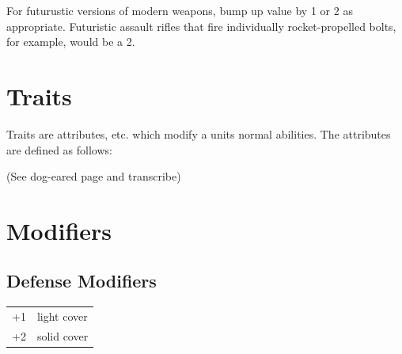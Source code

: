 \documentclass[12pt,titlepage]{article}
\begin{document}
  For futurustic versions of modern weapons, bump up value by 1 or 2
  as appropriate. Futuristic assault rifles that fire individually
  rocket-propelled bolts, for example, would be a 2.
  
  \section{Traits}
  
  Traits are attributes, etc. which modify a units normal
  abilities. The attributes are defined as follows:

  (See dog-eared page and transcribe)

  \section{Modifiers}

  \subsection{Defense Modifiers}

  \begin{tabular}{cl}
    +1 & light cover\\
    +2 & solid cover\\
  \end{tabular}
\end{document}
